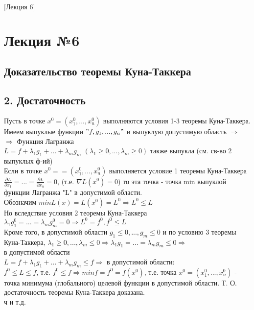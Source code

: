 [Лекция 6]


\Large
\section*{Лекция №6}
\subsection*{Доказательство теоремы Куна-Таккера}
\subsection*{2. Достаточность}
Пусть в точке $x^0 = (x_1^0, ..., x_n^0)$ выполняются условия 1-3 теоремы Куна-Таккера. \\
Имеем выпуклые функции $"f, g_1, ..., g_n"$ и выпуклую допустимую область $\Rightarrow$ \\
$\Rightarrow$ Функция Лагранжа \\
$L = f + \lambda_1g_1 + ... + \lambda_m g_m$ $(\lambda_1 \geqslant 0, ..., \lambda_m \geqslant 0)$ также выпукла (см. св-во 2 выпуклых ф-ий) \\
Если в точке $x^0 = = (x_1^0, ..., x_n^0)$ выполняется условие 1 теоремы Куна-Таккера
$\frac{\partial L}{\partial x_1} = ... = \frac{\partial L}{\partial x_n} = 0$, (т.е. $\nabla L (x^0) = 0$) то эта точка - точка min выпуклой функции Лагранжа "L" в допустимой области. \\
Обозначим $min L(x) = L (x^0) = L^0 \Rightarrow L^0 \leqslant L$ \\
Но вследствие условия 2 теоремы Куна-Таккера \\
$\lambda_1 g_1^0 = ... = \lambda_m g_m^0 = 0 \Rightarrow L^0 = f^0, f^0 \leqslant L$ \\
Кроме того, в допустимой области $g_1 \leqslant 0, ..., g_m \leqslant 0$ и по условию 3 теоремы Куна-Таккера, $\lambda_1 \geqslant 0, ..., \lambda_m \leqslant 0 \Rightarrow \lambda_1 g_1 = ... = \lambda_m g_m \leqslant 0 \Rightarrow$ \\
в допустимой области \\
$L = f + \lambda_1 g_1 + ... + \lambda_m g_m \leqslant f \Rightarrow$ в допустимой области: \\
$f^0 \leqslant L \leqslant f$, т.е. $f^0 \leqslant f \Rightarrow min f = f^0 = f(x^0)$, т.е. точка $x^0 = (x_1^0, ..., x_n^0)$
- точка минимума (глобального) целевой функции в допустимой области. 
Т. О. достаточность теоремы Куна-Таккера доказана. \\
ч и т.д. 
